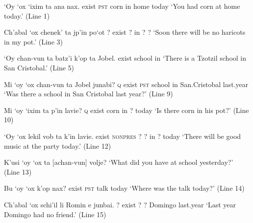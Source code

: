 \documentclass[12pt]{article}
\newcommand{\translate}[1]{`#1'}
\newcommand{\category}[1]{\textsc{#1}}
\def\\{}%
\begin{document}
\begin{exe}
    \ex\label{ex:text.1}
    \gll `Oy    `ox            `ixim ta ana  nax. \\
          exist \category{pst}  corn in home today\\
    \translate{You had corn at home today.} (Line 1)
    
    \ex\label{ex:text.3}
    \gll Ch'abal `ox   chenek' ta jp'in po`ot \\
         ?       exist ?       in ?     ? \\
    \translate{Soon there will be no haricots in my pot.} (Line 3)

    \ex\label{ex:text.5} 
    \gll `Oy chan-vun ta batz'i k'op ta Jobel. \\
          exist school in \\
    \translate{There is a Tzotzil school in San Cristobal.} (Line 5)
    
    \ex\label{ex:text.9} 
    \gll Mi           `oy    `ox            chan-vun ta Jobel          junabi?   \\
        \category{q}  exist  \category{pst} school   in San.Cristobal  last.year \\
    \translate{Was there a school in San Cristobal last year?} (Line 9)
    
    \ex\label{ex:text.10}
    \gll Mi            `oy  `ixim ta p'in lavie? \\
         \category{q}  exist corn in ?    today  \\
    \translate{Is there corn in his pot?} (Line 10)

    \ex\label{ex:text.12} 
    \gll `Oy   `ox                lekil vob ta k'in lavie. \\
         exist \category{nonpres} ?     ?   in ?    today\\
    \translate{There will be good music at the party today.} (Line 12)
    
    \ex\label{ex:text.13} K'usi `oy `ox ta [achan-vun] volje? \\
    \translate{What did you have at school yesterday?} (Line 13)
    
    \ex\label{ex:text.14} 
    \glt Bu `oy    `ox             k'op nax?  \\
             exist  \category{pst} talk today \\
    \translate{Where was the talk today?} (Line 14)
    
    \ex\label{ex:text.15} 
    \gll Ch'abal `ox    schi'il li Romin   e junbai. \\
         ?        exist ?       ?  Domingo   last.year\\
    \translate{Last year Domingo had no friend.} (Line 15)
\end{exe}
\end{document}
